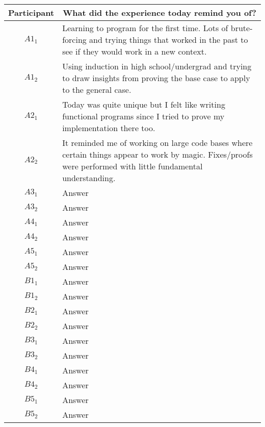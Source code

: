 \noindent
\begin{tabularx}{\linewidth}{@{}cX@{}}
  \toprule
  Participant & \multicolumn{1}{c}{
    \textbf{What did the experience today remind you of?}
  } \\ \midrule
  $A1_{1}$ & Learning to program for the first time. Lots of brute-forcing and trying things that worked in the past to see if they would work in a new context. \\
  $A1_{2}$ & Using induction in high school/undergrad and trying to draw insights from proving the base case to apply to the general case. \\
  $A2_{1}$ & Today was quite unique but I felt like writing functional programs since I tried to prove my implementation there too. \\
  $A2_{2}$ & It reminded me of working on large code bases where certain things appear to work by magic.  Fixes/proofs were performed with little fundamental understanding. \\
  $A3_{1}$ & Answer \\
  $A3_{2}$ & Answer \\
  $A4_{1}$ & Answer \\
  $A4_{2}$ & Answer \\
  $A5_{1}$ & Answer \\
  $A5_{2}$ & Answer \\
  \midrule
  $B1_{1}$ & Answer \\
  $B1_{2}$ & Answer \\
  $B2_{1}$ & Answer \\
  $B2_{2}$ & Answer \\
  $B3_{1}$ & Answer \\
  $B3_{2}$ & Answer \\
  $B4_{1}$ & Answer \\
  $B4_{2}$ & Answer \\
  $B5_{1}$ & Answer \\
  $B5_{2}$ & Answer \\
  \bottomrule
\end{tabularx}{\parfillskip=0pt\par}

